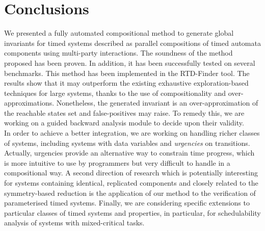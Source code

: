 \documentclass{LMCS}
\newcommand{\mycomment}[1]{}
\newcommand{\todo}[1]{\textcolor{OrangeRed}{TODO: #1}}
\theoremstyle{plain}\newtheorem{remark}[thm]{Remark}
\theoremstyle{plain}\newtheorem{example}[thm]{Example}
\begin{document}
\mycomment{
\todo{abstraction + 3 refs from the last reviewer }

Finally, we note that there is notable work on abstraction \cite{...}.
This work is orthogonal on our approach: the abstractions are with
respect to global states, consequently, their applicability to systems
with a great number of components is problematic.

For \cite{tiwari11:hybrid} underline that they do k-induction or
bounded model-checking, that is, the goal is to invalidate safety
properties \obs{not quite sure because they analyse why k-ind doesn't
  return safe for some workbenches}, while in our case, the goal is to
validate: if no solution, then we can conclude that the system is
safe. In addition, the approach in \cite{tiwari11:hybrid} relies on
quantifier elimination which does only works for a small number of
quantifiers (while for large systems this condition cannot be
satisfied/enforced/guaranteed).

\cite{tiwari05:inv-hybrid}

\cite{pettersson07:partial}
}


\section{Conclusions}
\label{sec:conc}
We presented a fully automated compositional method to generate global
invariants for timed systems described as parallel compositions of
timed automata components using multi-party interactions. The
soundness of the method proposed has been proven. In addition, it has
been successfully tested on several benchmarks.
This method has been implemented in the RTD-Finder tool. The results
show that it may outperform the existing exhaustive
exploration-based techniques for large systems, thanks to the use of
compositionality and over-approximations.
Nonetheless, the generated invariant is an over-approximation of the 
reachable states set and false-positives may raise. To remedy this, 
we are working on a guided backward analysis module to decide upon 
their validity. \\
 In order to achieve a better integration, we are working on handling 
 richer classes of systems, including systems with data variables 
 and {\it urgencies} \cite{BozgaSifakis06} on transitions.
 Actually, urgencies provide an alternative way to constrain time progress, which is more intuitive to
use by programmers but very difficult to handle in a compositional
way. A second direction of research which is potentially interesting
for systems containing identical, replicated components and closely
related to the symmetry-based reduction is the application of our
method to the verification of parameterised timed systems. Finally, we
are considering specific extensions to particular classes of timed
systems and properties, in particular, for schedulability analysis of
systems with mixed-critical tasks.
\end{document}
